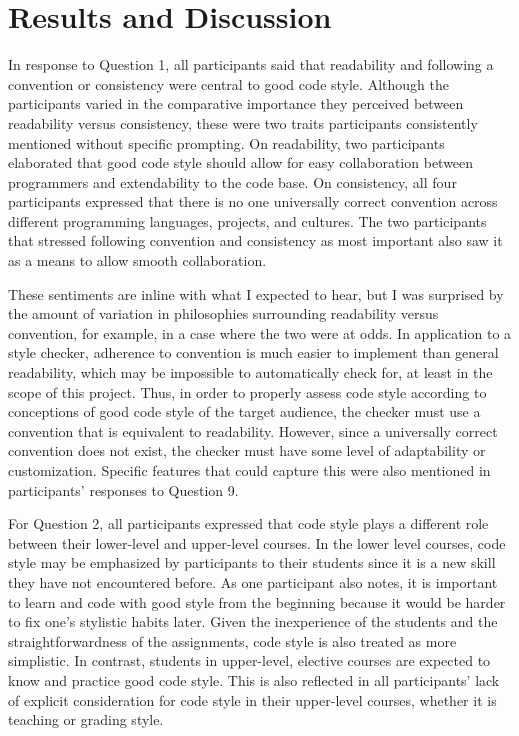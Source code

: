\documentclass[10pt,twocolumn]{article}
\begin{document}
\section{Results and Discussion}
In response to Question 1, all participants said that readability and following a convention or consistency were central to good code style. Although the participants varied in the comparative importance they perceived between readability versus consistency, these were two traits participants consistently mentioned without specific prompting. On readability, two participants elaborated that good code style should allow for easy collaboration between programmers and extendability to the code base. On consistency, all four participants expressed that there is no one universally correct convention across different programming languages, projects, and cultures. The two participants that stressed following convention and consistency as most important also saw it as a means to allow smooth collaboration. 

These sentiments are inline with what I expected to hear, but I was surprised by the amount of variation in philosophies surrounding readability versus convention, for example, in a case where the two were at odds. In application to a style checker, adherence to convention is much easier to implement than general readability, which may be impossible to automatically check for, at least in the scope of this project. Thus, in order to properly assess code style according to conceptions of good code style of the target audience, the checker must use a convention that is equivalent to readability. However, since a universally correct convention does not exist, the checker must have some level of adaptability or customization. Specific features that could capture this were also mentioned in participants’ responses to Question 9.

For Question 2, all participants expressed that code style plays a different role between their lower-level and upper-level courses. In the lower level courses, code style may be emphasized by participants to their students since it is a new skill they have not encountered before. As one participant also notes, it is important to learn and code with good style from the beginning because it would be harder to fix one’s stylistic habits later. Given the inexperience of the students and the straightforwardness of the assignments, code style is also treated as more simplistic. In contrast, students in upper-level, elective courses are expected to know and practice good code style. This is also reflected in all participants’ lack of explicit consideration for code style in their upper-level courses, whether it is teaching or grading style. 
\end{document}
